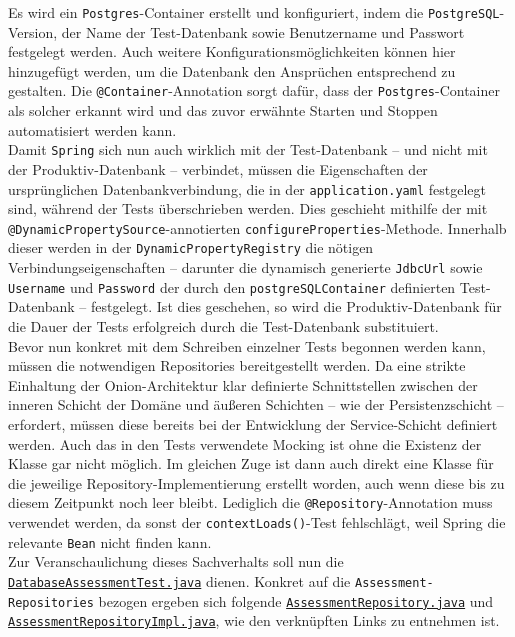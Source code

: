 Es wird ein \texttt{Postgres}-Container erstellt und konfiguriert, indem die 
\texttt{PostgreSQL}-Version, der Name der Test-Datenbank sowie Benutzername und 
Passwort festgelegt werden. Auch weitere Konfigurationsmöglichkeiten können hier 
hinzugefügt werden, um die Datenbank den Ansprüchen entsprechend zu gestalten. Die 
\texttt{@Container}-Annotation sorgt dafür, dass der \texttt{Postgres}-Container 
als solcher erkannt wird und das zuvor erwähnte Starten und Stoppen automatisiert 
werden kann. \\ 
Damit \texttt{Spring} sich nun auch wirklich mit der Test-Datenbank -- und nicht mit 
der Produktiv-Datenbank -- verbindet, müssen die Eigenschaften der ursprünglichen 
Datenbankverbindung, die in der \texttt{application.yaml} festgelegt sind, während 
der Tests überschrieben werden. Dies geschieht mithilfe der mit 
\texttt{@DynamicPropertySource}-annotierten \texttt{configureProperties}-Methode. 
Innerhalb dieser werden in der \texttt{DynamicPropertyRegistry} die nötigen 
Verbindungseigenschaften -- darunter die dynamisch generierte \texttt{JdbcUrl} sowie 
\texttt{Username} und \texttt{Password} der durch den \texttt{postgreSQLContainer} 
definierten Test-Datenbank -- festgelegt. Ist dies geschehen, so wird die 
Produktiv-Datenbank für die Dauer der Tests erfolgreich durch die Test-Datenbank 
substituiert. \\ 
Bevor nun konkret mit dem Schreiben einzelner Tests begonnen werden kann, müssen 
die notwendigen Repositories bereitgestellt werden. Da eine strikte Einhaltung der 
Onion-Architektur klar definierte Schnittstellen zwischen der inneren Schicht der 
Domäne und äußeren Schichten -- wie der Persistenzschicht -- erfordert, müssen diese 
bereits bei der Entwicklung der Service-Schicht definiert werden. Auch das in den Tests 
verwendete Mocking ist ohne die Existenz der Klasse gar nicht möglich. Im gleichen Zuge 
ist dann auch direkt eine Klasse für die jeweilige Repository-Implementierung erstellt 
worden, auch wenn diese bis zu diesem Zeitpunkt noch leer bleibt. Lediglich die 
\texttt{@Repository}-Annotation muss verwendet werden, da sonst der
\texttt{contextLoads()}-Test fehlschlägt, weil Spring die relevante \texttt{Bean} nicht 
finden kann. \\ 
Zur Veranschaulichung dieses Sachverhalts soll nun die 
\href{https://github.com/FlorianOhmes/bat_spielzeitenplaner/blob/main/spielzeitenplaner/src/test/java/de/bathesis/spielzeitenplaner/database/DatabaseAssessmentTest.java}{\texttt{DatabaseAssessmentTest.java}}
\linebreak dienen. 
Konkret auf die \texttt{Assessment-Repositories} bezogen ergeben sich folgende \linebreak 
\href{https://github.com/FlorianOhmes/bat_spielzeitenplaner/blob/fccaa502124b53ec672754dc262bb2d6ad1cd867/spielzeitenplaner/src/main/java/de/bathesis/spielzeitenplaner/services/repos/AssessmentRepository.java}{\texttt{AssessmentRepository.java}} 
und 
\href{https://github.com/FlorianOhmes/bat_spielzeitenplaner/blob/fccaa502124b53ec672754dc262bb2d6ad1cd867/spielzeitenplaner/src/main/java/de/bathesis/spielzeitenplaner/database/repoimpl/AssessmentRepositoryImpl.java}{\texttt{AssessmentRepositoryImpl.java}}, 
wie den verknüpften Links zu entnehmen ist. 


